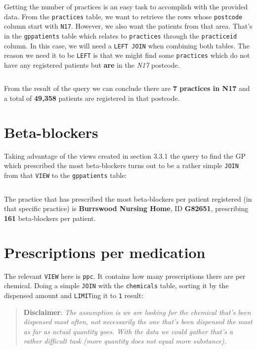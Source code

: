 \documentclass[english,a4paper,]{report}
\begin{document}
Getting the number of practices is an easy task to accomplish with the
provided data. From the \texttt{practices} table, we want to retrieve
the rows whose \texttt{postcode} column start with \texttt{N17}.
However, we also want the patients from that area. That's in the
\texttt{gppatients} table which relates to \texttt{practices} through
the \texttt{practiceid} column. In this case, we will need a
\texttt{LEFT\ JOIN} when combining both tables. The reason we need it to
be \texttt{LEFT} is that we might find some \texttt{practices} which do
not have any registered patients but \textbf{are} in the \emph{N17}
postcode.

\inputminted[firstline=5,lastline=15]{sql}{src/sql/02-queries.sql}

From the result of the query we can conclude there are \textbf{7
practices in N17} and a total of \textbf{49,358} patients are registered
in that postcode.

\section{Beta-blockers}\label{beta-blockers-1}

Taking advantage of the views created in section 3.3.1 the query to find
the GP which prescribed the most beta-blockers turns out to be a rather
simple \texttt{JOIN} from that \texttt{VIEW} to the \texttt{gppatients}
table:

\inputminted[firstline=27,lastline=39]{sql}{src/sql/02-queries.sql}

The practice that has prescribed the most beta-blockers per patient
registered (in that specific practice) is \textbf{Burrswood Nursing
Home}, ID \textbf{G82651}, prescribing \textbf{161} beta-blockers per
patient.

\section{Prescriptions per
medication}\label{prescriptions-per-medication}

The relevant \texttt{VIEW} here is \texttt{ppc}. It contains how many
prescriptions there are per chemical. Doing a simple \texttt{JOIN} with
the \texttt{chemicals} table, sorting it by the dispensed amount and
\texttt{LIMIT}ing it to \texttt{1} result:

\begin{quote}
\textbf{Disclaimer}: \emph{The assumption is we are looking for the
chemical that's been dispensed most often, not necessarily the one
that's been dispensed the most as far as actual quantity goes. With the
data we could gather that's a rather difficult task (more quantity does
not equal more substance).}
\end{quote}
\end{document}
